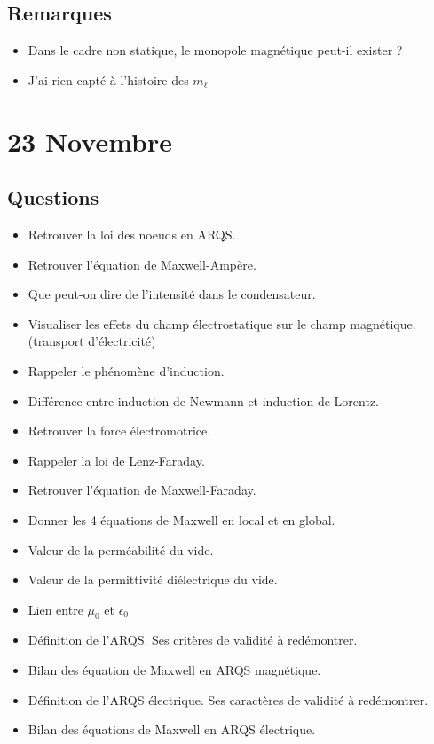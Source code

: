 \documentclass[a4paper, 11pt, hidelinks]{article}
\begin{document}
\subsection{Remarques}


\begin{itemize}
    \item Dans le cadre non statique, le monopole magnétique peut-il exister ?
    \item J'ai rien capté à l'histoire des $m_\ell$
\end{itemize}



\section{23 Novembre}


\subsection{Questions}


\begin{itemize}
    \item Retrouver la loi des noeuds en ARQS. \cite{Chapitre13}
    \item Retrouver l'équation de Maxwell-Ampère. \cite{Chapitre13}
    \item Que peut-on dire de l'intensité dans le condensateur. \cite{Chapitre13}
    \item Visualiser les effets du champ électrostatique sur le champ magnétique. (transport d'électricité) \cite{Chapitre13}
    \item Rappeler le phénomène d'induction. \cite{Chapitre13}
    \item Différence entre induction de Newmann et induction de Lorentz. \cite{Chapitre13}
    \item Retrouver la force électromotrice. \cite{Chapitre13}
    \item Rappeler la loi de Lenz-Faraday. \cite{Chapitre13}
    \item Retrouver l'équation de Maxwell-Faraday. \cite{Chapitre13}
    \item Donner les 4 équations de Maxwell en local et en global. \cite{Chapitre13}
    \item Valeur de la perméabilité du vide. \cite{Chapitre13}
    \item Valeur de la permittivité diélectrique du vide. \cite{Chapitre13}
    \item Lien entre $\mu_0$ et $\epsilon_0$ \cite{Chapitre13}
    \item Définition de l'ARQS. Ses critères de validité à redémontrer. \cite{Chapitre13}
    \item Bilan des équation de Maxwell en ARQS magnétique. \cite{Chapitre13}
    \item Définition de l'ARQS électrique. Ses caractères de validité à redémontrer. \cite{Chapitre13}
    \item Bilan des équations de Maxwell en ARQS électrique. \cite{Chapitre13}
\end{itemize}
\end{document}

